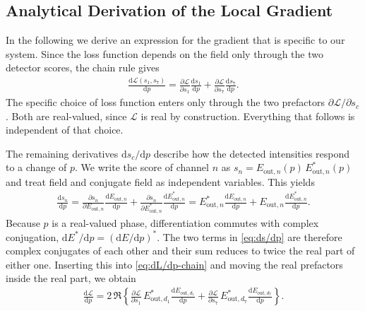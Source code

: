 \begin{appendices}

\section{Analytical Derivation of the Local Gradient}
\label{appendix:derivation}
In the following we derive an expression for the gradient that is specific to our system.
Since the loss function depends on the field only through the two detector scores, the chain rule gives
\begin{align}
    \frac{\mathrm{d}\mathcal{L}(s_1, s_7)}{\mathrm{d}p}
    =\frac{\partial \mathcal{L}}{\partial s_1}\frac{\mathrm{d}s_1}{\mathrm{d}p}
    +\frac{\partial \mathcal{L}}{\partial s_7}\frac{\mathrm{d}s_7}{\mathrm{d}p}.
    \label{eq:dL/dp-chain}
\end{align}
The specific choice of loss function enters only through the two prefactors $\partial\mathcal{L}/\partial s_c$. 
Both are real-valued, since $\mathcal{L}$ is real by construction. Everything that follows is independent of that choice.

The remaining derivatives $\mathrm{d}s_c/\mathrm{d}p$ describe how the detected intensities respond to a change of $p$. 
We write the score of channel $n$ as $s_n = E_{\mathrm{out},n}(p)\,E_{\mathrm{out},n}^{*}(p)$ and treat field and conjugate field as independent variables. 
This yields
\begin{align}
    \frac{\mathrm{d}s_n}{\mathrm{d}p}
    =\frac{\partial s_n}{\partial E_{\mathrm{out},n}}
     \frac{\mathrm{d}E_{\mathrm{out},n}}{\mathrm{d}p}
    +\frac{\partial s_n}{\partial E_{\mathrm{out},n}^{*}}
     \frac{\mathrm{d}E_{\mathrm{out},n}^{*}}{\mathrm{d}p}
    =E_{\mathrm{out},n}^{*}\frac{\mathrm{d}E_{\mathrm{out},n}}{\mathrm{d}p}
    +E_{\mathrm{out},n}\frac{\mathrm{d}E_{\mathrm{out},n}^{*}}{\mathrm{d}p}.
    \label{eq:ds/dp}
\end{align}
Because $p$ is a real-valued phase, differentiation commutes with complex conjugation, $\mathrm{d}E^{*}/\mathrm{d}p=(\mathrm{d}E/\mathrm{d}p)^{*}$. 
The two terms in \eqref{eq:ds/dp} are therefore complex conjugates of each other and their sum reduces to twice the real part of either one.
Inserting this into \eqref{eq:dL/dp-chain} and moving the real prefactors inside the real part, we obtain
\begin{align}
    \frac{\mathrm{d}\mathcal{L}}{\mathrm{d}p}
    =2\,\Re\left\{
        \frac{\partial \mathcal{L}}{\partial s_1}\,
        E_{\mathrm{out},d_1}^{*}
        \frac{\mathrm{d}E_{\mathrm{out},d_1}}{\mathrm{d}p}
       +\frac{\partial \mathcal{L}}{\partial s_7}\,
        E_{\mathrm{out},d_7}^{*}
        \frac{\mathrm{d}E_{\mathrm{out},d_7}}{\mathrm{d}p}
    \right\}.
    \label{eq:dL/dp-realpart}
\end{align}


\end{appendices}
